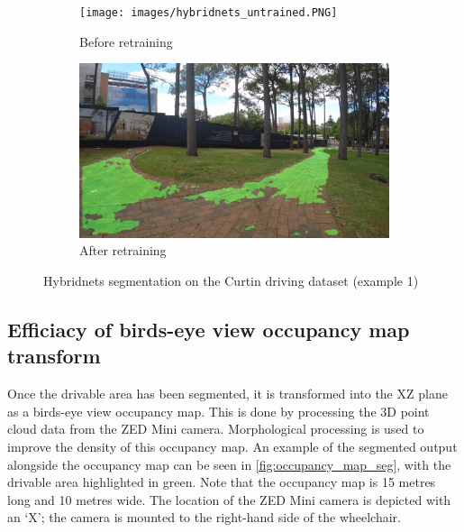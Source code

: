 \begin{figure}[b]
    \centering
    \begin{subfigure}{.45\textwidth}
        \centering
        \texttt{[image: images/hybridnets\_untrained.PNG]}
        \caption{Before retraining}
    \end{subfigure}
    \quad
    \begin{subfigure}{.45\textwidth}
        \centering
        \includegraphics[width=\linewidth]{images/hybridnets_trained.PNG}
        \caption{After retraining}
    \end{subfigure}
    \caption{Hybridnets segmentation on the Curtin driving dataset (example 1)}
    \label{fig:compare_trained_hybridnets}
\end{figure}

\subsection{Efficiacy of birds-eye view occupancy map transform}
Once the drivable area has been segmented, it is transformed into the XZ plane
as a birds-eye view occupancy map. This is done by processing the 3D point cloud
data from the ZED Mini camera.
Morphological processing is used to improve the density of this occupancy map.
An example of the segmented output alongside the occupancy map can be seen in \cref{fig:occupancy_map_seg},
with the drivable area highlighted in green.
Note that the occupancy map is 15 metres long and 10 metres wide. The location of the ZED Mini camera is depicted
with an `X'; the camera is mounted to the right-hand side of the wheelchair.

